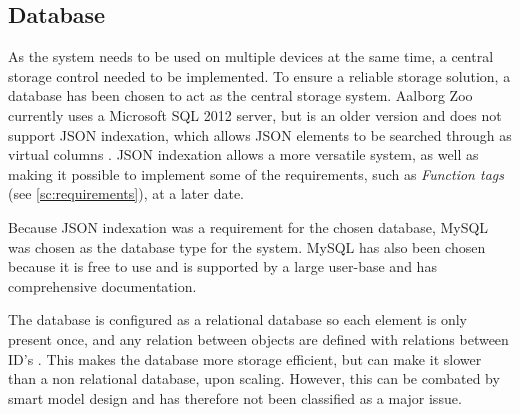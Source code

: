 \subsection{Database}\label{ssc:tech_database}
As the system needs to be used on multiple devices at the same time, a central storage control needed to be implemented. To ensure a reliable storage solution, a database has been chosen to act as the central storage system. Aalborg Zoo currently uses a Microsoft SQL 2012 server, but is an older version and does not support JSON indexation, which allows JSON elements to be searched through as virtual columns \citep{MySQLJSON}. JSON indexation allows a more versatile system, as well as making it possible to implement some of the requirements, such as \textit{Function tags} (see \autoref{sc:requirements}), at a later date.
\par
Because JSON indexation was a requirement for the chosen database, MySQL was chosen as the database type for the system. MySQL has also been chosen because it is free to use and is supported by a large user-base and has comprehensive documentation.
\par
The database is configured as a relational database so each element is only present once, and any relation between objects are defined with relations between ID's \citep{RelationalDB}. This makes the database more storage efficient, but can make it slower than a non relational database, upon scaling. However, this can be combated by smart model design and has therefore not been classified as a major issue.